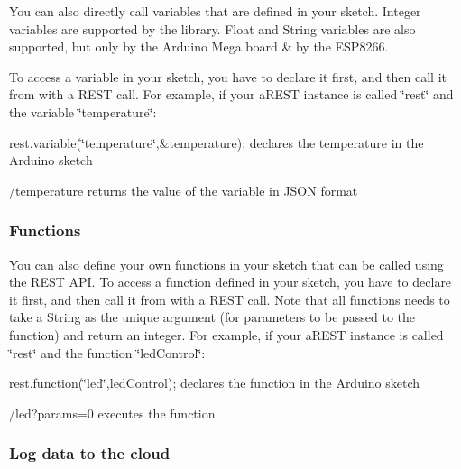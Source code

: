 You can also directly call variables that are defined in your sketch. Integer variables are supported by the library. Float and String variables are also supported, but only by the Arduino Mega board \& by the E\+S\+P8266.

To access a variable in your sketch, you have to declare it first, and then call it from with a R\+E\+ST call. For example, if your a\+R\+E\+ST instance is called \char`\"{}rest\char`\"{} and the variable \char`\"{}temperature\char`\"{}\+:
\begin{DoxyItemize}
\item {\ttfamily rest.\+variable(\char`\"{}temperature\char`\"{},\&temperature);} declares the temperature in the Arduino sketch
\item {\ttfamily /temperature} returns the value of the variable in J\+S\+ON format
\end{DoxyItemize}

\subsubsection*{Functions}

You can also define your own functions in your sketch that can be called using the R\+E\+ST A\+PI. To access a function defined in your sketch, you have to declare it first, and then call it from with a R\+E\+ST call. Note that all functions needs to take a String as the unique argument (for parameters to be passed to the function) and return an integer. For example, if your a\+R\+E\+ST instance is called \char`\"{}rest\char`\"{} and the function \char`\"{}led\+Control\char`\"{}\+:
\begin{DoxyItemize}
\item {\ttfamily rest.\+function(\char`\"{}led\char`\"{},led\+Control);} declares the function in the Arduino sketch
\item {\ttfamily /led?params=0} executes the function
\end{DoxyItemize}

\subsubsection*{Log data to the cloud}

